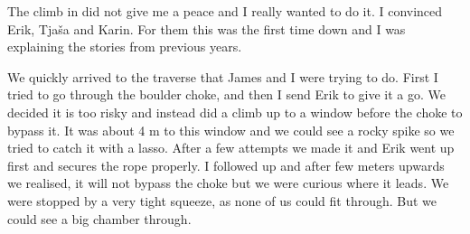 The climb in  did not give me a peace and I really wanted
to do it. I convinced Erik, Tjaša and Karin. For them this was the first
time down  and I was explaining the stories from previous years.


We quickly arrived to the traverse that James and I were trying to do. First
I tried to go through the boulder choke, and then I send Erik to give it
a go. We decided it is too risky and instead did a climb up to a window
before the choke to bypass it. It was about 4 m to this window and we
could see a rocky spike so we tried to catch it with a lasso. After a
few attempts we made it and Erik went up first and secures the rope
properly. I followed up and after few meters upwards we realised, it
will not bypass the choke but we were curious where it leads. We were
stopped by a very tight squeeze, as none of us could fit through. But we
could see a big chamber through.


